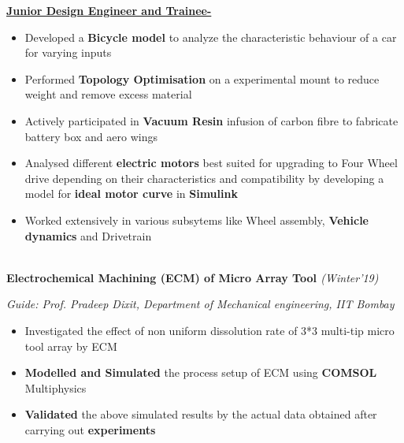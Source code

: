 \documentclass{article}
\begin{document}
\item{\textbf{\underline{Junior Design Engineer and Trainee-}}}
\begin{itemize}[itemsep = -0.75 mm, leftmargin=*]
\vspace{-3pt}
\item Developed a \textbf{Bicycle model} to analyze the characteristic behaviour of a car for varying inputs
\item Performed \textbf{Topology Optimisation} on a experimental mount to reduce weight and remove excess material
\item Actively participated in \textbf{Vacuum Resin} infusion of carbon fibre to fabricate battery box and aero wings
\item Analysed different \textbf{electric motors} best suited for upgrading to Four Wheel drive depending on their characteristics and compatibility by developing a model for \textbf{ideal motor curve} in \textbf{Simulink}
\item Worked extensively in various subsytems like Wheel assembly, \textbf{Vehicle dynamics} and Drivetrain
\end{itemize} \\
\textbf{\large{Electrochemical Machining (ECM) of Micro Array Tool }}\hfill{\sl \small (Winter'19)}
\vspace{-3pt} 
\item{{\sl\small Guide: Prof. Pradeep Dixit, Department of Mechanical engineering, IIT Bombay}}
\vspace{-6pt}
\begin{itemize}[itemsep = -0.75 mm, leftmargin=*]
\item Investigated the effect of non uniform dissolution rate of 3*3 multi-tip micro tool array by ECM
\item \textbf{Modelled and Simulated} the process setup of ECM using \textbf{COMSOL} Multiphysics
\item \textbf{Validated} the above simulated results by the actual data obtained after carrying out \textbf{experiments}
\end{itemize}
\end{document}
